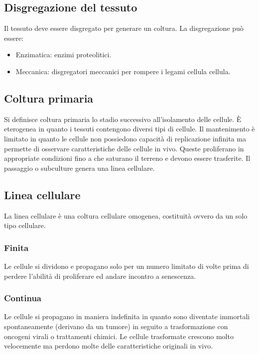 	\subsection{Disgregazione del tessuto}
	Il tessuto deve essere disgregato per generare un coltura.
	La disgregazione pu\`o essere:
		\begin{multicols}{2}
	\begin{itemize}
		\item Enzimatica: enzimi proteolitici.
		\item Meccanica: disgregatori meccanici per rompere i legami cellula cellula.
	\end{itemize}
\end{multicols}

	\subsection{Coltura primaria}
	Si definisce coltura primaria lo stadio successivo all'isolamento delle cellule.
	\`E eterogenea in quanto i tessuti contengono diversi tipi di cellule.
	Il mantenimento \`e limitato in quanto le cellule non possiedono capacit\`a di replicazione infinita ma permette di osservare caratteristiche delle cellule in vivo.
	Queste proliferano in appropriate condizioni fino a che saturano il terreno e devono essere trasferite. 
	Il passaggio o subculture genera una linea cellulare. 

	\subsection{Linea cellulare}
	La linea cellulare \`e una coltura cellulare omogenea, costituit\`a ovvero da un solo tipo cellulare.
			
		\subsubsection{Finita}
		Le cellule si dividono e propagano solo per un numero limitato di volte prima di perdere l'abilit\`a di proliferare ed andare incontro a senescenza.

		\subsubsection{Continua}
		Le cellule si propagano in maniera indefinita in quanto sono diventate immortali spontaneamente (derivano da un tumore) in seguito a trasformazione con oncogeni virali o trattamenti chimici.
		Le cellule trasformate crescono molto velocemente ma perdono molte delle caratteristiche originali in vivo. 

